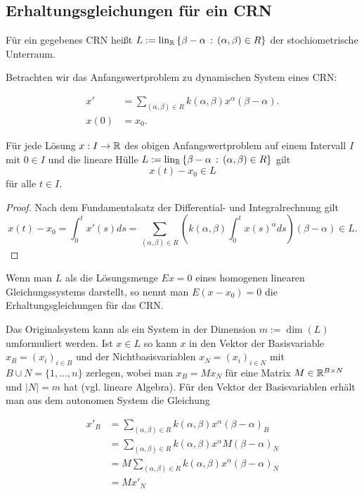 \documentclass[11pt]{article}
\numberwithin{equation}{section}
\begin{document}
\subsection{Erhaltungsgleichungen für ein CRN} 

Für ein gegebenes CRN heißt $L  := \operatorname{lin}_{\mathbb{R}} \left\{  \beta - \alpha  \,:\, (\alpha, \beta) \in R \right\}$ der stochiometrische Unterraum. 

Betrachten wir das Anfangswertproblem zu dynamischen System eines CRN: 

\begin{align*}
		x' & = \sum_{(\alpha, \beta) \in R} k(\alpha,\beta) x^\alpha ( \beta - \alpha). 
		\\ x(0) & = x_0. 
\end{align*}


\begin{proposition}
		Für jede Lösung $x  : I \to \mathbb{R}$ des obigen Anfangswertproblem auf einem Intervall $I$ mit $0 \in I$ und  die lineare Hülle $L := \operatorname{lin}_{\mathbb{R}} \left\{  \beta - \alpha  \,:\, (\alpha, \beta) \in R \right\}$ gilt 
		\[
			x(t) - x_0 \in L
		\]
		für alle $t \in I$. 
\end{proposition} 
\begin{proof}
	Nach dem Fundamentalsatz der Differential- und Integralrechnung gilt 
	\[
		x(t) - x_0 = \int_0^t x'(s) d s  = \sum_{(\alpha, \beta) \in R} \left( k(\alpha,\beta)   \int_0^t x(s)^\alpha d s \right) ( \beta - \alpha)  \in L. 
	\]
\end{proof} 

Wenn man $L$ als die Lösungsmenge $E x =0$ eines homogenen linearen Gleichungssystems darstellt, so nennt man $E ( x- x_0) = 0$ die Erhaltungsgleichungen für das CRN. 

\hrulefill 

Das Originalsystem kann als ein System in der Dimension $m:=\dim(L)$ umformuliert werden. Ist $x \in L$ so kann $x$ in den Vektor der Basisvariable $x_B = (x_i)_{i \in B}$ und der Nichtbasisvariablen $x_N = (x_i)_{i \in N}$ mit $B \cup N = \{1,\ldots,n\}$ zerlegen, wobei man $x_B = M x_N$ für eine Matrix $M \in \mathbb{R}^{B \times N}$ und $|N|=m$ hat (vgl. lineare Algebra). Für den Vektor der Basisvariablen erhält man aus dem autonomen System die Gleichung 

\begin{align*}
		x'_B & = \sum_{(\alpha, \beta) \in R} k(\alpha,\beta) x^\alpha (\beta - \alpha)_B
		\\ & = \sum_{(\alpha, \beta) \in R} k(\alpha,\beta) x^\alpha M (\beta - \alpha)_N 
		\\ & =  M\sum_{(\alpha, \beta) \in R} k(\alpha,\beta) x^\alpha  (\beta - \alpha)_N
		\\ & = M x'_N
\end{align*}
\end{document}
